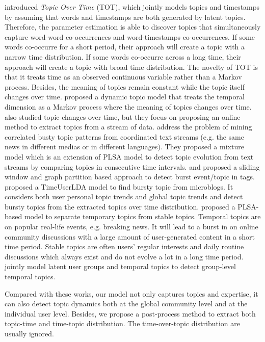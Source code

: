 \cite{wang2006topics} introduced \textit{Topic Over Time} (TOT), which jointly models topics and timestamps by assuming that words and timestamps are both generated by latent topics. Therefore, the parameter estimation is able to discover topics that simultaneously capture word-word co-occurrences and word-timestamps co-occurrences. If some words co-occurre for a short period, their approach will create a topic with a narrow time distribution. If some words co-occurre across a long time, their approach will create a topic with broad time distribution. The novelty of TOT  is that it treats time as an observed continuous variable rather than a Markov process. Besides, the meaning of topics remain constant while the topic itself changes over time. 
\cite{chp2blei2006dynamic} proposed a dynamic topic model that treats the temporal dimension as a Markov process where the meaning of topics changes over time. \cite{chp2onlineldaalsumait2008line} also studied topic changes over time, but they focus on proposing an online method to extract topics from a stream of data.
\cite{chp2wang2007mining} address the problem of mining correlated busty topic patterns from coordinated text streams (e.g. the same news in different medias or in different languages). They proposed a mixture model which is an extension of PLSA\cite{hofmann1999probabilistic} model to detect topic evolution from text streams by comparing topics in consecutive time intervals. 
\cite{chp2yao2010detecting} and \cite{chp2yao2012bursty} proposed a sliding window and graph partition based approach to detect burst event/topic in tags. 
\cite{chp7diao2012finding} proposed a TimeUserLDA model to find bursty topic from microblogs. It considers both user personal topic trends and global topic trends and detect bursty topics from the extracted topics over time distribution.
\cite{yin2013unified}  proposed a PLSA-based\cite{hofmann1999probabilistic} model to separate temporary topics from stable topics. Temporal topics are on popular real-life events, e.g. breaking news. It will lead to a burst in on online community discussions with a large amount of user-generated content in a short time period. Stable topics are often users' regular interests and daily routine discussions which always exist and do not evolve a lot in a long time period. \cite{hu2014user} jointly model latent user groups and temporal topics to detect group-level temporal topics.

Compared with these works, our model not only captures topics and expertise, it  can also detect topic dynamics both at the global community level and at the individual user level. Besides, we propose a post-process method to extract both topic-time and time-topic distribution. The time-over-topic distribution are usually ignored.

